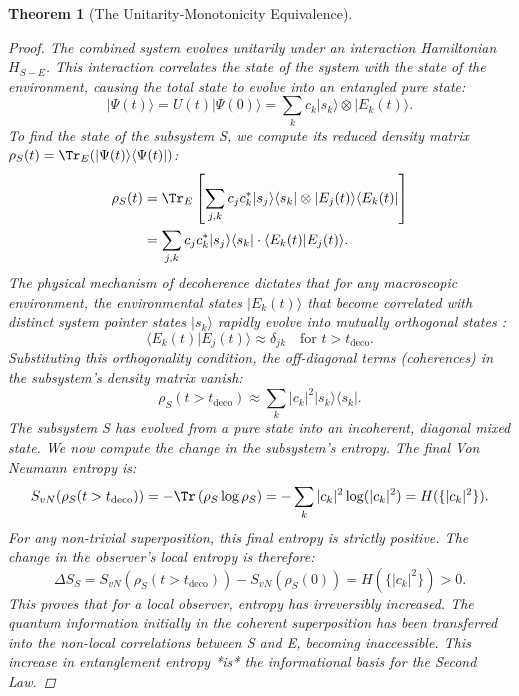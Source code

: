 \documentclass[11pt, letterpaper]{report}
\theoremstyle{plain} %
\newtheorem{theorem}{Theorem}[chapter]
\theoremstyle{definition} %
\theoremstyle{remark} %
\begin{document}
\begin{theorem}[The Unitarity-Monotonicity Equivalence]
\begin{proof}
The combined system evolves unitarily under an interaction Hamiltonian $H_{S-E}$. This interaction correlates the state of the system with the state of the environment, causing the total state to evolve into an entangled pure state:
\begin{equation}
    |\Psi(t)\rangle = U(t)|\Psi(0)\rangle = \sum_k c_k |s_k\rangle \otimes |E_k(t)\rangle.
    \label{eq:entangled_final_state}
\end{equation}
To find the state of the subsystem S, we compute its reduced density matrix $\rho_S(t) = \Tr_E(|\Psi(t)\rangle\langle\Psi(t)|)$:
\begin{align}
    \rho_S(t) &= \Tr_E \left[ \sum_{j,k} c_j c_k^* |s_j\rangle\langle s_k| \otimes |E_j(t)\rangle\langle E_k(t)| \right] \nonumber \\
              &= \sum_{j,k} c_j c_k^* |s_j\rangle\langle s_k| \cdot \langle E_k(t)|E_j(t)\rangle.
\end{align}
The physical mechanism of decoherence dictates that for any macroscopic environment, the environmental states $|E_k(t)\rangle$ that become correlated with distinct system pointer states $|s_k\rangle$ rapidly evolve into mutually orthogonal states \cite{Zurek2003, Schlosshauer2007}:
\begin{equation}
    \langle E_k(t)|E_j(t)\rangle \approx \delta_{jk} \quad \text{for } t > t_{\text{deco}}.
    \label{eq:env_orthogonality_final}
\end{equation}
Substituting this orthogonality condition, the off-diagonal terms (coherences) in the subsystem's density matrix vanish:
\begin{equation}
    \rho_S(t > t_{\text{deco}}) \approx \sum_k |c_k|^2 |s_k\rangle\langle s_k|.
    \label{eq:diagonalized_rho_S_final}
\end{equation}
The subsystem S has evolved from a pure state into an incoherent, diagonal mixed state. We now compute the change in the subsystem's entropy. The final Von Neumann entropy is:
\begin{equation}
    S_{vN}(\rho_S(t > t_{\text{deco}})) = -\Tr\left(\rho_S \log\rho_S\right) = -\sum_k |c_k|^2 \log(|c_k|^2) = H(\{|c_k|^2\}).
\end{equation}
For any non-trivial superposition, this final entropy is strictly positive. The change in the observer's local entropy is therefore:
\begin{equation}
    \Delta S_S = S_{vN}(\rho_S(t > t_{\text{deco}})) - S_{vN}(\rho_S(0)) = H(\{|c_k|^2\}) > 0.
\end{equation}
This proves that for a local observer, entropy has irreversibly increased. The quantum information initially in the coherent superposition has been transferred into the non-local correlations between S and E, becoming inaccessible. This increase in entanglement entropy *is* the informational basis for the Second Law.


\end{proof}
\end{theorem}
\end{document}
